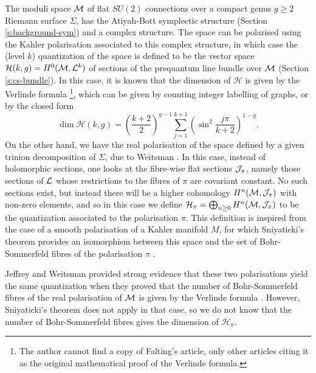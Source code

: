 
The moduli space $\mathcal{M}$ of flat $SU(2)$ connections over a compact genus $g\geq 2$ Riemann surface $\Sigma$, has the Atiyah-Bott symplectic structure (Section \ref{s:background-sym}) and a complex structure. The space can be polarised using the Kahler polarisation associated to this complex structure, in which case the (level $k$) quantization of the space is defined to be the vector space $\mathcal{H}(k,g)=H^0(\mathcal{M},\mathcal{L}^k)$ of sections of the prequantum line bundle over $\mathcal{M}$ (Section \ref{s:cs-bundle}). In this case, it is known that the dimension of $\mathcal{H}$ is given by the Verlinde formula \cite{verlinde_fusion_1988}\cite{schottenloher_mathematical_2008}\cite{faltings_proof_1994}\footnote{The author cannot find a copy of Falting's article, only other articles citing it as the original mathematical proof of the Verlinde formula.}, which can be given by counting integer labelling of graphs, or by the closed form 
\begin{equation}
	\dim \mathcal{H}(k,g) = \left(
	\frac{k+2}{2}
	\right)^{g-1}\sum_{j=1}^{k+1}\left(
	\sin^2\frac{j\pi}{k+2}
	\right)^{1-g}.
\end{equation}
On the other hand, we have the real polarisation of the space defined by a given trinion decomposition of $\Sigma$, due to Weitsman \cite{weitsman_real_1992}. In this case, instead of holomorphic sections, one looks at the fibre-wise flat sections $\mathcal{J}_{\pi}$, namely those sections of $\mathcal{L}$ whose restrictions to the fibres of $\pi$ are covariant constant. No such sections exist, but instead there will be a higher cohomology $H^n(\mathcal{M},\mathcal{J}_\pi)$ with non-zero elements, and so in this case we define $\mathcal{H}_\pi = \bigoplus_{n\geq 0} H^n(\mathcal{M}, \mathcal{J}_{\pi})$ to be the quantization associated to the polarisation $\pi$. This definition is inspired from the case of a smooth polarisation of a Kahler manifold $M$, for which Sniyaticki's theorem provides an isomorphism between this space and the set of Bohr-Sommerfeld fibres of the polarisation $\pi$ \cite{sniatycki_cohomology_1977}.

Jeffrey and Weitsman provided strong evidence that these two polarisations yield the same quantization when they proved that the number of Bohr-Sommerfeld fibres of the real polarisation of $\mathcal{M}$ is given by the Verlinde formula \cite{jeffrey_bohr-sommerfeld_1992}. However, Sniyaticki's theorem does not apply in that case, so we do not know that the number of Bohr-Sommerfeld fibres gives the dimension of $\mathcal{H}_\pi$.

